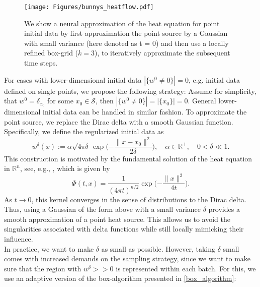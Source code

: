 \documentclass[12pt,openany]{book}
\def\S{\mathcal{S}}
\theoremstyle{plainnormal}
\theoremstyle{remark}
\begin{document}
\begin{figure}
    
    \texttt{[image: Figures/bunnys\_heatflow.pdf]}
    
\caption{We show a neural approximation of the heat equation for point initial data by first approximation the point source by a Gaussian with small variance (here denoted as t = 0) and then use a locally refined box-grid ($k=3$), to iteratively approximate the subsequent time steps.} \label{point_bunny}
\end{figure}
For cases with lower-dimensional initial data $|\{w^0 \neq0\}| = 0$, e.g. initial data defined on single points, we propose the following strategy:
Assume for simplicity, that $w^0 = \delta_{x_0}$ for some $x_0\in\S$, then $|\{w^0 \neq0\}| = |\{x_0\}| = 0$. General lower-dimensional initial data can be handled in similar fashion. To approximate the point source, we replace the Dirac delta with a smooth Gaussian function. Specifically, we define the regularized initial data as
\[
w^{\delta}(x) := \alpha \sqrt{4\pi\delta} \, \exp\Bigg({-\frac{\|x - x_0\|^2}{2\delta}}\Bigg), \quad \alpha \in \mathbb{R}^+, \quad 0 < \delta \ll 1.
\]
This construction is motivated by the fundamental solution of the heat equation in \( \mathbb{R}^n \), see, e.g., \cite{evans2}, which is given by
\[
\Phi(t, x) = \frac{1}{(4\pi t)^{n/2}} \exp\Big({-\frac{\|x\|^2}{4t}}\Big).
\]
As \( t \to 0 \), this kernel converges in the sense of distributions to the Dirac delta. Thus, using a Gaussian of the form above with a small variance \( \delta \) provides a smooth approximation of a point heat source. This allows us to avoid the singularities associated with delta functions while still locally mimicking their influence.\\
In practice, we want to make $\delta$ as small as possible. However, taking $\delta$ small comes with increased demands on the sampling strategy, since we want to make sure that the region with $w^\delta >> 0$ is represented within each batch. For this, we use an adaptive version of the box-algorithm presented in \cref{box_algorithm}: 
\end{document}
